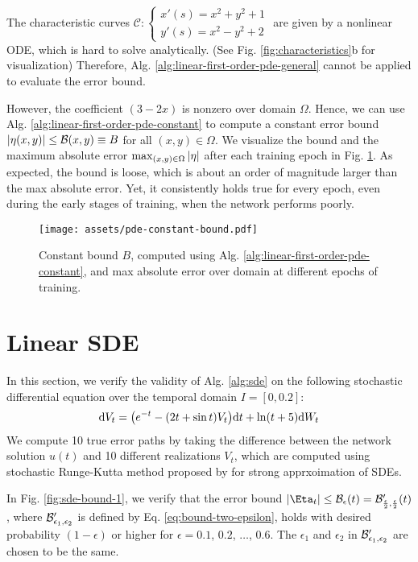     The characteristic curves {$\mathcal{C}: \begin{cases*} x'(s) = x^2+y^2+1 \\[-0.25em] y'(s) = x^2 - y^2 + 2 \end{cases*}$} are given by a nonlinear ODE, which is hard to solve analytically. 
    (See Fig. \ref{fig:characteristics}b for visualization)
    Therefore, Alg. \ref{alg:linear-first-order-pde-general} cannot be applied to evaluate the error bound. 

    However, the coefficient $(3-2x)$ is nonzero over domain $\Omega$.
    Hence, we can use Alg. \ref{alg:linear-first-order-pde-constant} to compute a constant error bound $|\eta(x, y)| \leq \mathcal{B}(x, y) \equiv B$ for all $(x, y) \in \Omega$.
    We visualize the bound and the maximum absolute error $\max_{(x, y)\in\Omega}|\eta|$ after each training epoch in Fig. \ref{fig:pde-constant-bound}.
    As expected, the bound is loose, which is about an order of magnitude larger than the max absolute error.
    Yet, it consistently holds true for every epoch, even during the early stages of training, when the network performs poorly.
    \makeatletter
    \setlength{\@fptop}{0pt}
    \begin{figure}[!ht]
        \centering
        \texttt{[image: assets/pde-constant-bound.pdf]}
        \caption{
            Constant bound $B$, computed using Alg. \ref{alg:linear-first-order-pde-constant}, and max absolute error over domain at different epochs of training.
        }\label{fig:pde-constant-bound}
    \end{figure}
    \makeatother

\section{Linear SDE}
    In this section, we verify the validity of Alg. \ref{alg:sde} on the following stochastic differential equation over the temporal domain $I=[0, 0.2]$:
    \begin{equation}\label{eq:sde-experiment}
        \mathrm{d} V_t = \big(e^{-t} -(2t + \sin t) V_t \big)\mathrm{d} t + \ln(t+5) \mathrm{d} W_t
    \end{equation}
    We compute 10 true error paths by taking the difference between the network solution $u(t)$ and 10 different realizations $V_t$, which are computed using stochastic Runge-Kutta method proposed by \citeauthor{rossler2010runge} \cite{rossler2010runge} for strong apprxoimation of SDEs.

    In Fig. \ref{fig:sde-bound-1}, we verify that the error bound $|\Eta_t| \leq \Bound_{\epsilon}(t) = \Bound'_{\frac{\epsilon}{2}, \frac{\epsilon}{2}}(t)$, where $\mathcal{B}'_{\epsilon_1, \epsilon_2}$ is defined by Eq. \eqref{eq:bound-two-epsilon}, holds with desired probability $(1-\epsilon)$ or higher for $\epsilon = 0.1$, $0.2$, $\dots$, $0.6$. 
    The $\epsilon_1$ and $\epsilon_2$ in $\mathcal{B}'_{\epsilon_1, \epsilon_2}$ are chosen to be the same.

